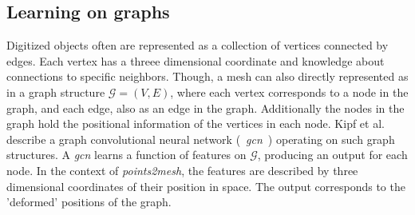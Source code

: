 \subsection*{Learning on graphs}
    Digitized objects often are represented as a collection of vertices connected by edges. Each vertex has a threee dimensional
    coordinate and knowledge about connections to specific neighbors. Though, a mesh can also directly represented as in a graph 
    structure $\mathcal{G}=(V,E)$, where each vertex corresponds to a node in the graph, and each edge, also as an edge in the graph.
    Additionally the nodes in the graph hold the positional information of the vertices in each node.
    Kipf et al. \cite{DBLP:journals/corr/KipfW16} describe a graph convolutional neural network (~\emph{gcn}~) operating on such graph
    structures. A \emph{gcn} learns a function of features on $\mathcal{G}$, producing an output for each node. In the context of
    \emph{points2mesh}, the features are described by three dimensional coordinates of their position in space. The output corresponds
    to the 'deformed' positions of the graph.

